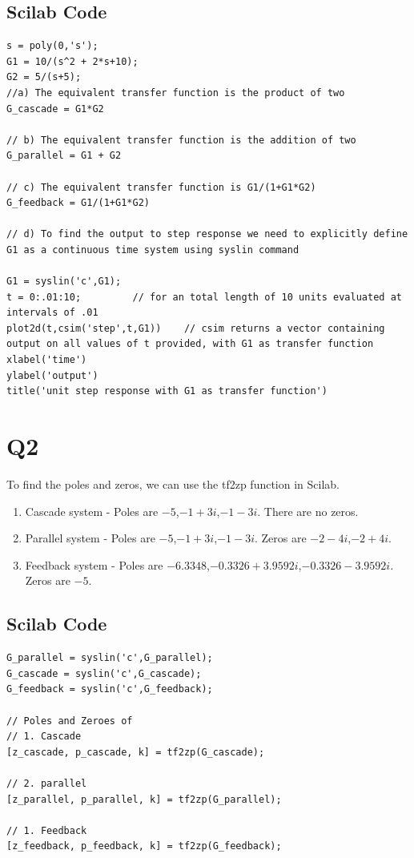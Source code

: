 \documentclass[10pt]{article}
\begin{document}
\subsection*{Scilab Code}
\begin{verbatim}
s = poly(0,'s');
G1 = 10/(s^2 + 2*s+10);
G2 = 5/(s+5);
//a) The equivalent transfer function is the product of two
G_cascade = G1*G2

// b) The equivalent transfer function is the addition of two
G_parallel = G1 + G2

// c) The equivalent transfer function is G1/(1+G1*G2) 
G_feedback = G1/(1+G1*G2)

// d) To find the output to step response we need to explicitly define G1 as a continuous time system using syslin command

G1 = syslin('c',G1);
t = 0:.01:10;         // for an total length of 10 units evaluated at intervals of .01
plot2d(t,csim('step',t,G1))    // csim returns a vector containing output on all values of t provided, with G1 as transfer function
xlabel('time')
ylabel('output')
title('unit step response with G1 as transfer function')
\end{verbatim}


\section*{Q2}
To find the poles and zeros, we can use the tf2zp function in Scilab.\\
 \begin{enumerate}
     \item Cascade system - Poles are $-5$,$-1+3i$,$-1-3i$. There are no zeros.\\
     \item Parallel system - Poles are $-5$,$-1+3i$,$-1-3i$. Zeros are $-2-4i$,$-2+4i$.\\
     \item Feedback system - Poles are $-6.3348$,$-0.3326+3.9592i$,$-0.3326-3.9592i$. Zeros are $-5$.\\
 \end{enumerate}
 \subsection*{Scilab Code}
 \begin{verbatim}
G_parallel = syslin('c',G_parallel);
G_cascade = syslin('c',G_cascade);
G_feedback = syslin('c',G_feedback);

// Poles and Zeroes of 
// 1. Cascade
[z_cascade, p_cascade, k] = tf2zp(G_cascade);

// 2. parallel
[z_parallel, p_parallel, k] = tf2zp(G_parallel);

// 1. Feedback
[z_feedback, p_feedback, k] = tf2zp(G_feedback);
 \end{verbatim}
 
\end{document}

